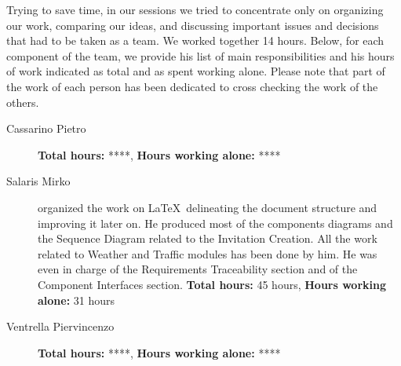 Trying to save time, in our sessions we tried to concentrate only on organizing our work, comparing our ideas, and discussing important issues and decisions that had to be taken as a team. We worked together 14 hours.
\newline
Below, for each component of the team, we provide his list of main responsibilities and his hours of work indicated as total and as spent working alone. Please note that part of the work of each person has been dedicated to cross checking the work of the others.
\begin{description}
	\item[Cassarino Pietro]
		\textbf{Total hours:} ****, \textbf{Hours working alone:} ****
	\item[Salaris Mirko]
		organized the work on \LaTeX\ delineating the document structure and improving it later on. He produced most of the components diagrams and the Sequence Diagram related to the Invitation Creation. All the work related to Weather and Traffic modules has been done by him. He was even in charge of the Requirements Traceability section and of the Component Interfaces section.
		\newline
		\textbf{Total hours:} 45 hours, \textbf{Hours working alone:} 31 hours
	\item[Ventrella Piervincenzo]
		\textbf{Total hours:} ****, \textbf{Hours working alone:} ****
\end{description}